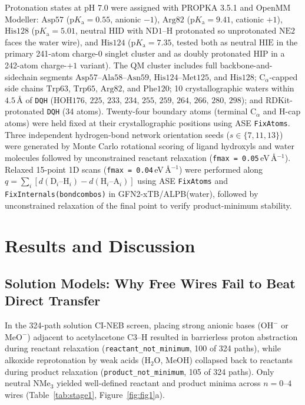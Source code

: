 \documentclass[11pt,a4paper]{article}
\begin{document}
Protonation states at pH $7.0$ were assigned with PROPKA 3.5.1 and OpenMM Modeller: $\text{Asp57}$ ($\text{p}K_{\text{a}} = 0.55$, anionic $-1$), $\text{Arg82}$ ($\text{p}K_{\text{a}} = 9.41$, cationic $+1$), $\text{His128}$ ($\text{p}K_{\text{a}} = 5.01$, neutral $\text{HID}$ with $\text{ND1--H}$ protonated so unprotonated $\text{NE2}$ faces the water wire), and $\text{His124}$ ($\text{p}K_{\text{a}} = 7.35$, tested both as neutral $\text{HIE}$ in the primary 241-atom charge-$0$ singlet cluster and as doubly protonated $\text{HIP}$ in a 242-atom charge-$+1$ variant). The QM cluster includes full backbone-and-sidechain segments $\text{Asp57--Ala58--Asn59}$, $\text{His124--Met125}$, and $\text{His128}$; $\text{C}_\alpha$-capped side chains $\text{Trp63}$, $\text{Trp65}$, $\text{Arg82}$, and $\text{Phe120}$; 10 crystallographic waters within $4.5$\,\AA{} of \texttt{DQH} ($\text{HOH176, 225, 233, 234, 255, 259, 264, 266, 280, 298}$); and RDKit-protonated \texttt{DQH} (34 atoms). Twenty-four boundary atoms (terminal $\text{C}_\alpha$ and H-cap atoms) were held fixed at their crystallographic positions using ASE \texttt{FixAtoms}. Three independent hydrogen-bond network orientation seeds ($s \in \{7, 11, 13\}$) were generated by Monte Carlo rotational scoring of ligand hydroxyls and water molecules followed by unconstrained reactant relaxation (\texttt{fmax = 0.05}\,eV\,\AA$^{-1}$). Relaxed 15-point 1D scans (\texttt{fmax = 0.04}\,eV\,\AA$^{-1}$) were performed along $q = \sum_i[d(\text{D}_i\text{--H}_i) - d(\text{H}_i\text{--A}_i)]$ using ASE \texttt{FixAtoms} and \texttt{FixInternals(bondcombos)} in GFN2-xTB/ALPB(water), followed by unconstrained relaxation of the final point to verify product-minimum stability.

\section{Results and Discussion}

\subsection{Solution Models: Why Free Wires Fail to Beat Direct Transfer}
In the 324-path solution CI-NEB screen, placing strong anionic bases ($\text{OH}^-$ or $\text{MeO}^-$) adjacent to acetylacetone C3--H resulted in barrierless proton abstraction during reactant relaxation (\texttt{reactant\_not\_minimum}, 100 of 324 paths), while alkoxide reprotonation by weak acids ($\text{H}_2\text{O}$, $\text{MeOH}$) collapsed back to reactants during product relaxation (\texttt{product\_not\_minimum}, 105 of 324 paths). Only neutral $\text{NMe}_3$ yielded well-defined reactant and product minima across $n = 0$--$4$ wires (Table~\ref{tab:stage1}, Figure~\ref{fig:fig1}a).
\end{document}
